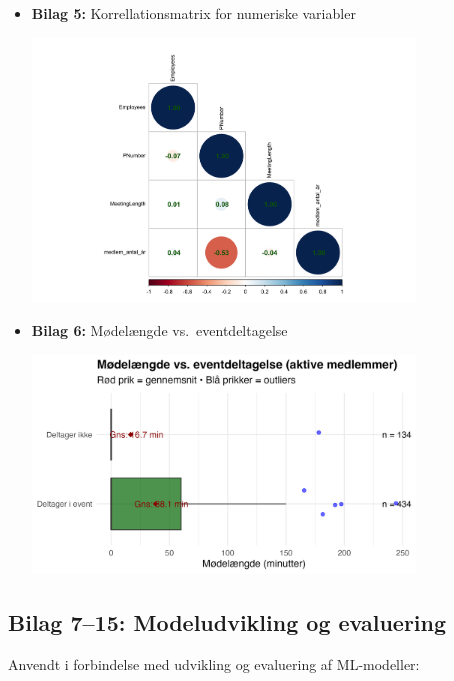 \documentclass[
  11pt,
  letterpaper,
  DIV=11,
  numbers=noendperiod]{scrartcl}
\begin{document}
\begin{itemize}
\begin{center}
  \end{center}
\item
  \textbf{Bilag 5:} Korrellationsmatrix for numeriske variabler
  \begin{center}
  \includegraphics[width=0.8\textwidth,height=\textheight]{images/EDA_6_korrellationsmatrix.png}
  \end{center}
\item
  \textbf{Bilag 6:} Mødelængde vs.~eventdeltagelse\\
  \begin{center}
  \includegraphics[width=0.8\textwidth,height=\textheight]{images/EDA_7_mødelængde_eventdeltagelse.png}
  \end{center}
\end{itemize}

\subsection{Bilag 7--15: Modeludvikling og
evaluering}\label{bilag-715-modeludvikling-og-evaluering}

Anvendt i forbindelse med udvikling og evaluering af ML-modeller:
\end{document}
